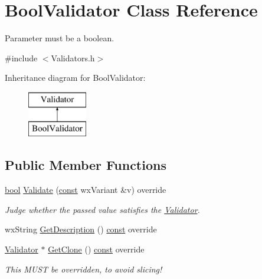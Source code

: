 \hypertarget{class_bool_validator}{}\section{Bool\+Validator Class Reference}
\label{class_bool_validator}


Parameter must be a boolean.  




{\ttfamily \#include $<$Validators.\+h$>$}

Inheritance diagram for Bool\+Validator\+:\begin{figure}[H]
\begin{center}
\leavevmode
\includegraphics[height=2.000000cm]{class_bool_validator}
\end{center}
\end{figure}
\subsection*{Public Member Functions}
\begin{DoxyCompactItemize}
\item 
\hyperlink{mac_2config_2i386_2lib-src_2libsoxr_2soxr-config_8h_abb452686968e48b67397da5f97445f5b}{bool} \hyperlink{class_bool_validator_a3b14d9bb3ce532ecf54c9c6ce4e43830}{Validate} (\hyperlink{getopt1_8c_a2c212835823e3c54a8ab6d95c652660e}{const} wx\+Variant \&v) override
\begin{DoxyCompactList}\small\item\em Judge whether the passed value satisfies the \hyperlink{class_validator}{Validator}. \end{DoxyCompactList}\item 
wx\+String \hyperlink{class_bool_validator_aa89cdd4642578063191dc7893bbbbfb3}{Get\+Description} () \hyperlink{getopt1_8c_a2c212835823e3c54a8ab6d95c652660e}{const}  override
\item 
\hyperlink{class_validator}{Validator} $\ast$ \hyperlink{class_bool_validator_a49a0aa333b84c3164690f92533247eee}{Get\+Clone} () \hyperlink{getopt1_8c_a2c212835823e3c54a8ab6d95c652660e}{const}  override
\begin{DoxyCompactList}\small\item\em This M\+U\+ST be overridden, to avoid slicing! \end{DoxyCompactList}\end{DoxyCompactItemize}


